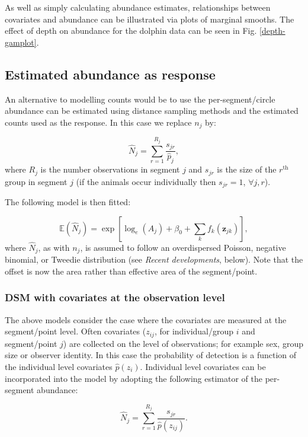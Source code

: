 \documentclass[a4paper,12pt]{article}
\begin{document}
As well as simply calculating abundance estimates, relationships between covariates and abundance can be illustrated via plots of marginal smooths. The effect of depth on abundance for the dolphin data can be seen in Fig. \ref{depth-gamplot}. 

\subsection*{Estimated abundance as response}

An alternative to modelling counts would be to use the per-segment/circle abundance can be estimated using distance sampling methods and the estimated counts used as the response. In this case we replace $n_j$ by:

\begin{equation*}
\hat{N}_j = \sum_{r=1}^{R_j} \frac{s_{jr}}{\hat{p}_j},
\end{equation*}
where $R_j$ is the number observations in segment $j$ and $s_{jr}$ is the size of the $r^\text{th}$ group in segment $j$ (if the animals occur individually then $s_{jr}=1$, $\forall j,r$). 

The following model is then fitted:

\begin{equation*}
\mathbb{E}(\hat{N}_j) = \exp\left[ \log_e \left( A_j \right) + \beta_0 + \sum_k f_k\left(\bm{z}_{jk}\right) \right],
\end{equation*}
where $\hat{N}_j$, as with $n_j$, is assumed to follow an overdispersed Poisson, negative binomial, or Tweedie distribution (see \textit{Recent developments}, below). Note that the offset is now the area rather than effective area of the segment/point.

\subsubsection*{DSM with covariates at the observation level}

The above models consider the case where the covariates are measured at the segment/point level. Often covariates ($z_{ij}$, for individual/group $i$ and segment/point $j$) are collected on the level of observations; for example sex, group size or observer identity. In this case the probability of detection is a function of the individual level covariates $\hat{p}(z_i)$. Individual level covariates can be incorporated into the model by adopting the following estimator of the per-segment abundance:

\begin{equation*}
\hat{N}_j = \sum_{r=1}^{R_j} \frac{s_{jr}}{\hat{p}(z_{ij})}.
\end{equation*}
\end{document}
